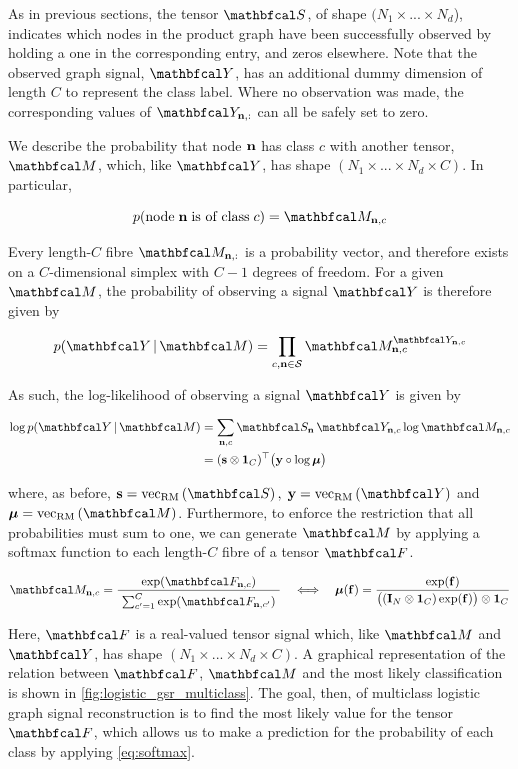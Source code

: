 As in previous sections, the tensor $\St$, of shape $(N_1 \times ... \times N_d$), indicates which nodes in the product graph have been successfully observed by holding a one in the corresponding entry, and zeros elsewhere. Note that the observed graph signal, $\Yt$, has an additional dummy dimension of length $C$ to represent the class label. Where no observation was made, the corresponding values of $\Yt_{\nn, :}$ can all be safely set to zero. 

We describe the probability that node $\mathbf{n}$ has class $c$ with another tensor, $\Mt$, which, like $\Yt$, has shape $(N_1 \times ... \times N_d \times C)$. In particular, 

\begin{equation*}
    p(\text{node} \; \nn \; \text{is of class} \; c) = \Mt_{\nn, c}
\end{equation*}

Every length-$C$ fibre $\Mt_{\nn, :}$ is a probability vector, and therefore exists on a $C$-dimensional simplex with $C-1$ degrees of freedom. For a given $\Mt$, the probability of observing a signal $\Yt$ is therefore given by

\begin{equation}
    p(\Yt \, | \, \Mt) = \prod_{c, \nn \in \mathcal{S}} \Mt_{\nn, c}^{\Yt_{\nn, c}}
\end{equation}

As such, the log-likelihood of observing a signal $\Yt$ is given by 

\begin{align}
    \log p(\Yt \, | \, \Mt) &= \sum_{\nn, c} \St_{\nn} \, \Yt_{\nn, c} \log \Mt_{\nn, c} \notag \\
    &= (\s \otimes \one_C)^\top \big(\y \circ \log \muu \big)
 \end{align}
 

where, as before, $\s = \vecrm{\St}, \; \y = \vecrm{\Yt}$ and $\muu = \vecrm{\Mt}$. Furthermore, to enforce the restriction that all probabilities must sum to one, we can generate $\Mt$ by applying a softmax function to each length-$C$ fibre of a tensor $\Ft$. 

\begin{equation}
    \label{eq:softmax}
    \Mt_{\nn, c} = \frac{\exp(\Ft_{\nn, c})}{ \raisebox{-0.1cm} { $\sum_{c'=1}^C \exp(\Ft_{\nn, c'})$ }}  \quad \Longleftrightarrow \quad \muu(\f) = \frac{\exp(\f)}{ \big((\I_N \otimes \one_C) \exp(\f)\big) \otimes \one_C}
\end{equation}

Here, $\Ft$ is a real-valued tensor signal which, like $\Mt$ and $\Yt$, has shape $(N_1 \times ... \times N_d \times C)$. A graphical representation of the relation between $\Ft$, $\Mt$ and the most likely classification is shown in \cref{fig:logistic_gsr_multiclass}. The goal, then, of multiclass logistic graph signal reconstruction is to find the most likely value for the tensor $\Ft$, which allows us to make a prediction for the probability of each class by applying \cref{eq:softmax}.  

